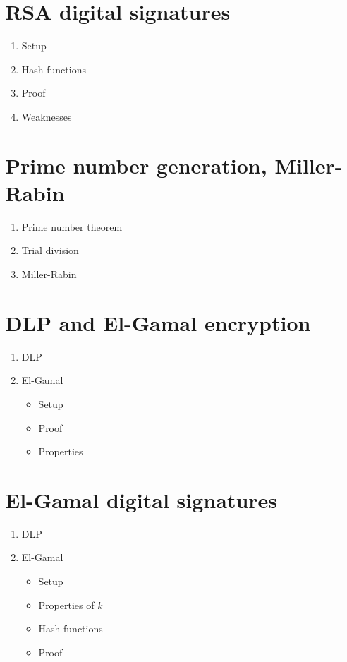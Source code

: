 \documentclass{article}
\begin{document}
\section{RSA digital signatures}
\begin{enumerate}
\item Setup
\item Hash-functions
\item Proof
\item Weaknesses
\end{enumerate}
\clearpage

\section{Prime number generation, Miller-Rabin}
\begin{enumerate}
\item Prime number theorem
\item Trial division
\item Miller-Rabin
\end{enumerate}
\clearpage

\section{DLP and El-Gamal encryption}
\begin{enumerate}
\item DLP
\item El-Gamal
  \begin{itemize}
  \item Setup
  \item Proof
  \item Properties
  \end{itemize}
\end{enumerate}
\clearpage

\section{El-Gamal digital signatures}
\begin{enumerate}
\item DLP
\item El-Gamal
  \begin{itemize}
  \item Setup
  \item Properties of $k$
  \item Hash-functions
  \item Proof
  \end{itemize}
\end{enumerate}
\clearpage
\end{document}
